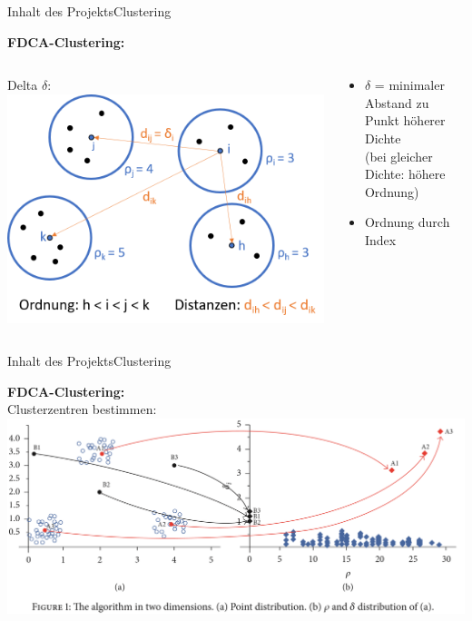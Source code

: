\documentclass[12pt, xcolor={usenames,dvipsnames,svgnames,x11names,table}]{beamer}
\begin{document}
	\begin{frame}{Inhalt des Projekts}{Clustering}
	
		\textbf{FDCA-Clustering:}
		\\\bigskip
		\begin{columns}[c, onlytextwidth]
			\begin{column}{.6\textwidth}
				Delta $\delta$:\\
				\bigskip
				\includegraphics[scale=0.5]{delta}
			\end{column}
			
			\begin{column}{.4\textwidth}
				\begin{itemize}
					\item $\delta$ = minimaler Abstand zu Punkt höherer Dichte\\
					(bei gleicher Dichte: höhere Ordnung)
					\item Ordnung durch Index
				\end{itemize}
			\end{column}
		\end{columns}
		
	\end{frame}
	
	\begin{frame}{Inhalt des Projekts}{Clustering}
	
		\textbf{FDCA-Clustering:}
		\\\bigskip
		Clusterzentren bestimmen:\\
		\includegraphics[scale=0.355]{rho_delta}
		
	\end{frame}
	
\end{document}
